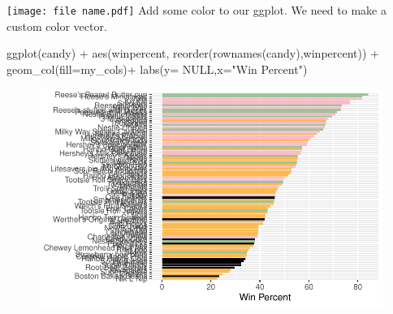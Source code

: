 \documentclass[
  letterpaper,
  DIV=11,
  numbers=noendperiod]{scrartcl}
\newenvironment{Shaded}{\begin{snugshade}}{\end{snugshade}}
\newcommand{\AttributeTok}[1]{\textcolor[rgb]{0.40,0.45,0.13}{#1}}
\newcommand{\ConstantTok}[1]{\textcolor[rgb]{0.56,0.35,0.01}{#1}}
\newcommand{\DocumentationTok}[1]{\textcolor[rgb]{0.37,0.37,0.37}{\textit{#1}}}
\newcommand{\FunctionTok}[1]{\textcolor[rgb]{0.28,0.35,0.67}{#1}}
\newcommand{\NormalTok}[1]{\textcolor[rgb]{0.00,0.23,0.31}{#1}}
\newcommand{\OtherTok}[1]{\textcolor[rgb]{0.00,0.23,0.31}{#1}}
\newcommand{\SpecialCharTok}[1]{\textcolor[rgb]{0.37,0.37,0.37}{#1}}
\newcommand{\StringTok}[1]{\textcolor[rgb]{0.13,0.47,0.30}{#1}}
\begin{document}
\texttt{[image: file name.pdf]} Add some color to our ggplot. We need to
make a custom color vector.

\begin{Shaded}
\end{Shaded}

\begin{Shaded}
\begin{Highlighting}[]
\FunctionTok{ggplot}\NormalTok{(candy) }\SpecialCharTok{+} 
  \FunctionTok{aes}\NormalTok{(winpercent, }\FunctionTok{reorder}\NormalTok{(}\FunctionTok{rownames}\NormalTok{(candy),winpercent)) }\SpecialCharTok{+}
  \FunctionTok{geom\_col}\NormalTok{(}\AttributeTok{fill=}\NormalTok{my\_cols)}\SpecialCharTok{+}
  \FunctionTok{labs}\NormalTok{(}\AttributeTok{y=} \ConstantTok{NULL}\NormalTok{,}\AttributeTok{x=}\StringTok{"Win Percent"}\NormalTok{)}
\end{Highlighting}
\end{Shaded}

\begin{figure}[H]

{\centering \includegraphics{class09_files/figure-pdf/unnamed-chunk-20-1.pdf}

}

\end{figure}
\end{document}
